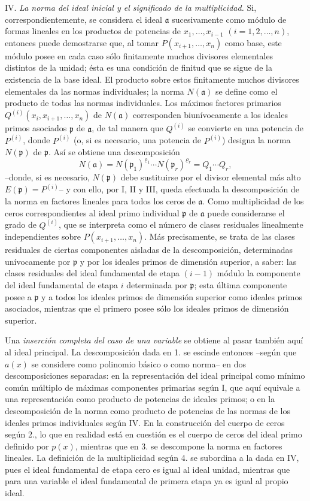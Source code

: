 \documentclass[11pt]{article}
\begin{document}
IV. \emph{La norma del ideal inicial y el significado de la multiplicidad.} Si, correspondientemente, se considera el ideal $\mathfrak a$ sucesivamente como módulo de formas lineales en los productos de potencias de $x_1,\ldots,x_{i-1}$ $(i=1,2,\ldots,n)$, entonces puede demostrarse que, al tomar $P(x_{i+1},\ldots,x_n)$ como base, este módulo posee en cada caso sólo finitamente muchos divisores elementales distintos de la unidad; ésta es una condición de finitud que se sigue de la existencia de la base ideal. El producto sobre estos finitamente muchos divisores elementales da las normas individuales; la norma $N(\mathfrak a)$ se define como el producto de todas las normas individuales. Los máximos factores primarios $Q^{(i)}(x_i,x_{i+1},\ldots,x_n)$ de $N(\mathfrak a)$ corresponden biunívocamente a los ideales primos asociados $\mathfrak p$ de $\mathfrak a$, de tal manera que $Q^{(i)}$ se convierte en una potencia de $P^{(i)}$, donde $P^{(i)}$ (o, si es necesario, una potencia de $P^{(i)}$) designa la norma $N(\mathfrak p)$ de $\mathfrak p$. Así se obtiene una descomposición
\[
 N(\mathfrak a)=N(\mathfrak p_1)^{\varrho_1}\cdots N(\mathfrak p_r)^{\varrho_r}=Q_1\cdots Q_r,
\]
--donde, si es necesario, $N(\mathfrak p)$ debe sustituirse por el divisor elemental más alto $E(\mathfrak p)=P^{(i)}$-- y con ello, por I, II y III, queda efectuada la descomposición de la norma en factores lineales para todos los ceros de $\mathfrak a$. Como multiplicidad de los ceros correspondientes al ideal primo individual $\mathfrak p$ de $\mathfrak a$ puede considerarse el grado de $Q^{(i)}$, que se interpreta como el número de clases residuales linealmente independientes sobre $P(x_{i+1},\ldots,x_n)$. Más precisamente, se trata de las clases residuales de ciertas componentes aisladas de la descomposición, determinadas unívocamente por $\mathfrak p$ y por los ideales primos de dimensión superior, a saber: las clases residuales del ideal fundamental de etapa $(i-1)$ módulo la componente del ideal fundamental de etapa $i$ determinada por $\mathfrak p$; esta última componente posee a $\mathfrak p$ y a todos los ideales primos de dimensión superior como ideales primos asociados, mientras que el primero posee sólo los ideales primos de dimensión superior.

Una \emph{inserción completa del caso de una variable} se obtiene al pasar también aquí al ideal principal. La descomposición dada en 1. se escinde entonces --según que $a(x)$ se considere como polinomio básico o como norma-- en dos descomposiciones separadas: en la representación del ideal principal como mínimo común múltiplo de máximas componentes primarias según I, que aquí equivale a una representación como producto de potencias de ideales primos; o en la descomposición de la norma como producto de potencias de las normas de los ideales primos individuales según IV. En la construcción del cuerpo de ceros según 2., lo que en realidad está en cuestión es el cuerpo de ceros del ideal primo definido por $p(x)$, mientras que en 3. se descompone la norma en factores lineales. La definición de la multiplicidad según 4. se subordina a la dada en IV, pues el ideal fundamental de etapa cero es igual al ideal unidad, mientras que para una variable el ideal fundamental de primera etapa ya es igual al propio ideal.
\end{document}
